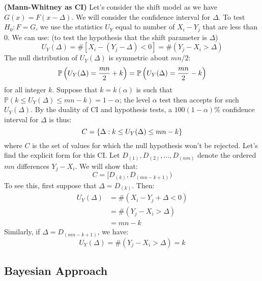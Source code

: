 \begin{remark}{\textbf{(Mann-Whitney as CI)}}
    Let's consider the shift model as we have $G(x) = F(x-\Delta)$. We will consider the confidence interval for $\Delta$. To test $H_0:F=G$, we use the statistics $U_Y$ equal to number of $X_i - Y_j$ that are less than $0$. We can use: (to test the hypothesis that the shift parameter is $\Delta$)
    \begin{equation*}
        U_Y(\Delta) = \#[X_i - (Y_j - \Delta) < 0] = \#(Y_j - X_i > \Delta)
    \end{equation*}
    The null distribution of $U_Y(\Delta)$ is symmetric about $mn/2$:
    \begin{equation*}
        \mathbb{P}\left( U_Y(\Delta) = \frac{mn}{2} + k \right) = \mathbb{P}\left( U_Y(\Delta) = \frac{mn}{2} - k \right)
    \end{equation*}
    for all integer $k$. Suppose that $k = k(\alpha)$ is such that $\mathbb{P}(k\le U_Y(\Delta) \le mn-k) = 1-\alpha$; the level $\alpha$ test then accepts for such $U_Y(\Delta)$. By the duality of CI and hypothesis tests, a $100(1-\alpha)\%$ confidence interval for $\Delta$ is thus:
    \begin{equation*}
        C = \left\{ \Delta : k \le U_Y(\Delta) \le mn-k \right\}
    \end{equation*}
    where $C$ is the set of values for which the null hypothesis won't be rejected. Let's find the explicit form for this CI. Let $D_{(1)},D_{(2)},\dots, D_{(nm)}$ denote the ordered $mn$ differences $Y_j - X_i$. We will show that:
    \begin{equation*}
        C = [D_{(k)}, D_{(mn-k+1)})
    \end{equation*}
    To see this, first suppose that $\Delta = D_{(k)}$. Then:
    \begin{equation*}
    \begin{aligned}
        U_Y(\Delta) &= \#(X_i - Y_j + \Delta < 0) \\
        &= \#(Y_j - X_i > \Delta) \\
        &= mn-k
    \end{aligned}
    \end{equation*}
    Similarly, if $\Delta = D_{(mn - k + 1)}$, we have:
    \begin{equation*}
        U_Y(\Delta) = \#(Y_j - X_i > \Delta) = k
    \end{equation*}
\end{remark}

\subsection{Bayesian Approach}

